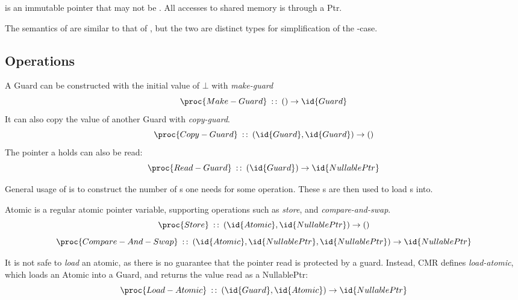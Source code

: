 \begin{definition}
   is an immutable pointer that may not be \nullptr. All accesses to shared memory is
  through a Ptr.
\end{definition}
The semantics of  are similar to that of , but the two are distinct types
for simplification of the \nullptr-case.


\subsection{Operations}

A Guard can be constructed with the initial value of $\bot$ with \emph{make-guard}
\begin{equation}\label{eq:make-guard}
  \proc{Make-Guard}\typeof{} () \to \id{Guard}
\end{equation}
It can also copy the value of another Guard with \emph{copy-guard}.
\begin{equation}\label{eq:copy-guard}
  \proc{Copy-Guard}\typeof{} (\id{Guard}, \id{Guard}) \to ()
\end{equation}
The pointer a  holds can also be read:
\begin{equation}\label{eq:read-guard}
  \proc{Read-Guard}\typeof{} (\id{Guard}) \to \id{NullablePtr}
\end{equation}

General usage of  is to construct the number of s one needs for some operation.
These s are then used to load s into.

Atomic is a regular atomic pointer variable, supporting operations such as \emph{store}, and
\emph{compare-and-swap}.
\begin{equation}\label{eq:atomic-store}
  \proc{Store}\typeof{} (\id{Atomic}, \id{NullablePtr}) \to ()
\end{equation}
\begin{equation}\label{eq:atomic-cas}
  \proc{Compare-And-Swap}\typeof (\id{Atomic}, \id{NullablePtr}, \id{NullablePtr}) \to
  \id{NullablePtr}
\end{equation}

It is not safe to \emph{load} an atomic, as there is no guarantee that the
pointer read is protected by a guard. Instead, CMR defines \emph{load-atomic}, which loads an
Atomic into a Guard, and returns the value read as a NullablePtr:
\begin{equation}\label{eq:load-atomic}
  \proc{Load-Atomic}\typeof{} (\id{Guard}, \id{Atomic}) \to \id{NullablePtr}
\end{equation}

